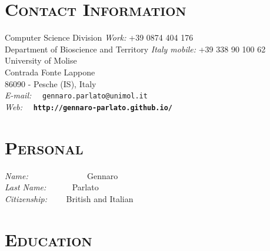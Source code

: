 \begin{resume}




\section{\bfseries \scshape Contact Information}

Computer Science Division \hfill \emph{Work:} +39 0874 404 176\\ 
Department of Bioscience and Territory \hfill \hfill \emph{Italy mobile:}   +39 338 90 100 62\\ %
University of Molise \\ %
Contrada Fonte Lappone \\%
86090 - Pesche (IS), Italy\\

\emph{E-mail:} ~~{\tt gennaro.parlato@unimol.it} \\
\emph{Web:}  ~~{\bf\tt http://gennaro-parlato.github.io/} 





\section{\bfseries \scshape  Personal}
 \emph{Name:} {~~~~~~~~~~~~~ Gennaro}\\
 \emph{Last Name:} {~~~~~ Parlato}\\
 \emph{Citizenship:} {~~~\, British and Italian}\\



\section{\bfseries \scshape  Education}


\end{resume}
